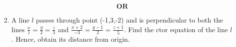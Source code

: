 \documentclass{article}
\begin{document}
\begin{enumerate}
\begin{enumerate}
		$$\textbf{OR}$$

	\item A line $l$ passes through point (-1,3,-2) and is perpendicular to both the lines $\frac {x}{1}=\frac{y}{2}=\frac{z}{3}$ and $\frac {x+2}{-3}=\frac{y-1}{2}=\frac{z+1}{5}$. Find the ctor equation of the line $l$. Hence, obtain its distance from origin.

		\end{enumerate}

\end{enumerate}
\end{document}
